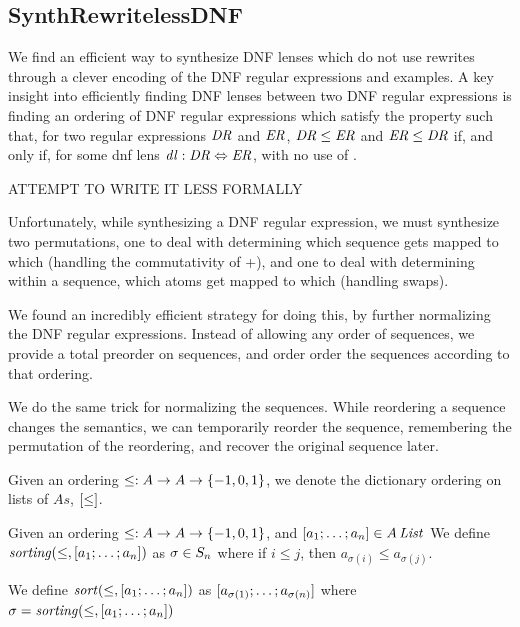 \subsection{SynthRewritelessDNF}
We find an efficient way to synthesize DNF lenses which do not use rewrites
through a clever encoding of the DNF regular expressions and examples.
A key insight into efficiently finding DNF lenses between two DNF regular
expressions is finding an ordering of DNF regular expressions which satisfy the
property such that, for two regular expressions $\mathit{DR}$ and $\mathit{ER}$,
$\mathit{DR} \leq \mathit{ER}$ and $\mathit{ER} \leq \mathit{DR}$ if, and only if,
for some dnf lens $\mathit{dl} : \mathit{DR} \Leftrightarrow \mathit{ER}$,
with no use of \DNFRewriteLensRule{}.

ATTEMPT TO WRITE IT LESS FORMALLY

Unfortunately, while synthesizing a DNF regular expression, we must synthesize
two permutations, one to deal with determining which sequence
gets mapped to which (handling the commutativity of +), and one to deal
with determining within a sequence, which atoms get mapped to which
(handling swaps).

We found an incredibly efficient strategy for doing this, by further normalizing
the DNF regular expressions.  Instead of allowing any order of sequences, we
provide a total preorder on sequences, and order order the sequences
according to that ordering.

We do the same trick for normalizing the sequences.  While reordering a sequence
changes the semantics, we can temporarily reorder the sequence, remembering the
permutation of the reordering, and recover the original sequence later.

\begin{definition}
Given an ordering $\leq : A \rightarrow A \rightarrow \{-1,0,1\}$,
we denote the dictionary ordering on lists of $As$, $[ \leq ]$.
\end{definition}

\begin{definition}
  Given an ordering $\leq : A \rightarrow A \rightarrow \{-1,0,1\}$,
  and $[ a_1;\ldots;a_n ]\in A\,\mathit{List}$
  We define $\mathit{sorting}(\leq,[ a_1;\ldots;a_n ])$ as
  $\sigma \in S_{n}$ where if $i\leq j$,
  then $a_{\sigma(i)} \leq a_{\sigma(j)}$.

  We define $\mathit{sort}(\leq,[ a_1;\ldots;a_n ])$ as
  $[ a_{\sigma(1)};\ldots;a_{\sigma(n)} ]$ where
  $\sigma=\mathit{sorting}(\leq,[ a_1;\ldots;a_n ])$
\end{definition}

